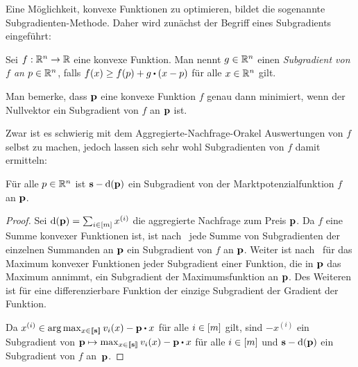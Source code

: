 Eine Möglichkeit, konvexe Funktionen zu optimieren, bildet die sogenannte Subgradienten-Methode.
Daher wird zunächst der Begriff eines Subgradients eingeführt:
\begin{definition}[Subgradient]
	Sei $f:\R^n \rightarrow \R$ eine konvexe Funktion.
	Man nennt $g\in\mathbb{R}^n$ einen \emph{Subgradient von $f$ an $p\in\R^n$}, falls $f(x) \geq f(p) + g\bcdot (x - p)$ für alle $x\in\mathbb{R}^n$ gilt.
\end{definition}
Man bemerke, dass $\mathbf{p}$ eine konvexe Funktion $f$ genau dann minimiert, wenn der Nullvektor ein Subgradient von $f$ an $\mathbf{p}$ ist.

\iffalse
\begin{proposition}\label{prop-convex-lipschitz}
Sei $f: \R^n \rightarrow \R$ eine konvexe und bezüglich $\norm{\cdot}$ Lipschitz-stetige Funktion mit Lipschitz-Konstante $L$.
Dann gilt $\norm{g}\leq L$ für jeden Subgradienten $g$ von $f$ an jedem Punkt $p\in\R^n$.
\end{proposition}
\begin{proof}
Es gilt $\norm{g} = g \bcdot (g \cdot \norm{g}^{-1}) \leq  f(g \cdot \norm{g}^{-1} + p) - f(p) \leq L \cdot \norm{g}\cdot \norm{g}^{-1} = L$.
\end{proof}
\fi

Zwar ist es schwierig mit dem Aggregierte-Nachfrage-Orakel Auswertungen von $f$ selbst zu machen, jedoch lassen sich sehr wohl Subgradienten von $f$ damit ermitteln:
\begin{lemma}\label{lemma-subgradient}
	Für alle $p\in\R^n$ ist $\mathbf{s} - \operatorname{d}(\mathbf{p})$ ein Subgradient von der Marktpotenzialfunktion $f$ an $\mathbf{p}$.
\end{lemma}
\begin{proof}
	Sei $\operatorname{d}(\mathbf{p}) = \sum_{i\in\left[ m \right]} x^{(i)}$ die aggregierte Nachfrage zum Preis $\mathbf{p}$.
	Da $f$ eine Summe konvexer Funktionen ist, ist nach~\cite[Theorem~1.12]{Shor1985} jede Summe von Subgradienten der einzelnen Summanden an $\mathbf{p}$ ein Subgradient von $f$ an $\mathbf{p}$.
	Weiter ist nach~\cite[Theorem~1.13]{Shor1985} für das Maximum konvexer Funktionen jeder Subgradient einer Funktion, die in $\mathbf{p}$ das Maximum annimmt, ein Subgradient der Maximumsfunktion an $\mathbf{p}$.
	Des Weiteren ist für eine differenzierbare Funktion der einzige Subgradient der Gradient der Funktion.
	
	Da $x^{(i)}\in \arg\max_{x\in\ffirst{\fs}} v_i(x) - \fp \bcdot x$ für alle $i\in\left[ m \right]$ gilt, sind $-x^{(i)}$ ein Subgradient von $\fp \mapsto \max_{x\in\ffirst{\fs}} v_i(x) - \fp \bcdot x$ für alle $i\in\left[ m \right]$ und $\mathbf{s} - \operatorname{d}(\mathbf{p})$ ein Subgradient von $f$ an~$\mathbf{p}$.
\end{proof}


